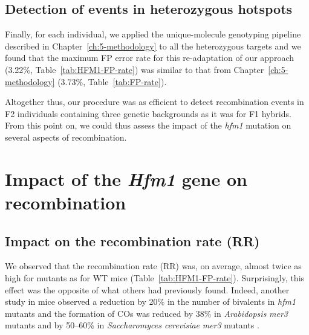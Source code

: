 

\subsection{Detection of events in heterozygous hotspots}

Finally, for each individual, we applied the unique-molecule genotyping pipeline described in Chapter~\ref{ch:5-methodology} to all the heterozygous targets and we found that the maximum FP error rate for this re-adaptation of our approach (3.22\%, Table~\ref{tab:HFM1-FP-rate}) was similar to that from Chapter~\ref{ch:5-methodology} (3.73\%, Table~\ref{tab:FP-rate}).

Altogether thus, our procedure was as efficient to detect recombination events in F2 individuals containing three genetic backgrounds as it was for F1 hybrids.
From this point on, we could thus assess the impact of the \textit{hfm1} mutation on several aspects of recombination.







\section{Impact of the \textit{Hfm1} gene on recombination}
\subsection{Impact on the recombination rate (RR)}
\label{chap8:recombination-rate}

We observed that the recombination rate (RR) was, on average, almost twice as high for mutants as for WT mice (Table~\ref{tab:HFM1-FP-rate}).
Surprisingly, this effect was the opposite of what others had previously found.
Indeed, another study in mice observed a reduction by 20\% in the number of bivalents in \textit{hfm1} mutants \citep{guiraldelli2013mouse} and the formation of COs was reduced by 38\% in \textit{Arabidopsis} \textit{mer3} mutants \citep{mercier2005two} and by 50--60\% in \textit{Saccharomyces cerevisiae} \textit{mer3} mutants \citep{borner2004crossover,jessop2006meiotic}.

